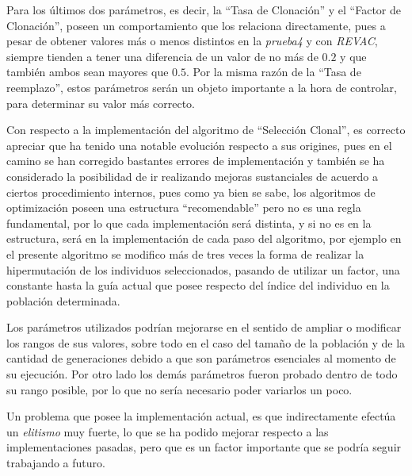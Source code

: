 Para los últimos dos parámetros, es decir, la ``Tasa de Clonación'' y el ``Factor de Clonación'',
poseen un comportamiento que los relaciona directamente, pues a pesar de obtener valores más o menos
distintos en la \emph{prueba4} y con \emph{REVAC}, siempre tienden a tener una diferencia de un valor de no más
de $0.2$ y que también ambos sean mayores que $0.5$. Por la misma razón de la ``Tasa de reemplazo'',
estos parámetros serán un objeto importante a la hora de controlar, para determinar su valor más correcto.



Con respecto a la implementación del algoritmo de ``Selección Clonal'', es correcto apreciar que ha tenido una notable
evolución respecto a sus origines, pues en el camino se han corregido bastantes errores de implementación y también
se ha considerado la posibilidad de ir realizando mejoras sustanciales de acuerdo a ciertos procedimiento internos,
pues como ya bien se sabe, los algoritmos de optimización poseen una estructura ``recomendable'' pero no es una regla
fundamental, por lo que cada implementación será distinta, y si no es en la estructura, será en la implementación de cada
paso del algoritmo, por ejemplo en el presente algoritmo se modifico más de tres veces la forma de realizar la hipermutación
de los individuos seleccionados, pasando de utilizar un factor, una constante hasta la guía actual que posee respecto
del índice del individuo en la población determinada.

Los parámetros utilizados podrían mejorarse en el sentido de  ampliar o modificar los rangos de sus valores, sobre todo
en el caso del tamaño de la población y de la cantidad de generaciones debido a que son parámetros esenciales al momento
de su ejecución. Por otro lado los demás parámetros fueron probado dentro de todo su rango posible, por lo que no sería
necesario poder variarlos un poco.

Un problema que posee la implementación actual, es que indirectamente efectúa un \emph{elitismo} muy fuerte, lo que se ha
podido mejorar respecto a las implementaciones pasadas, pero que es un factor importante que se podría seguir trabajando a futuro.

